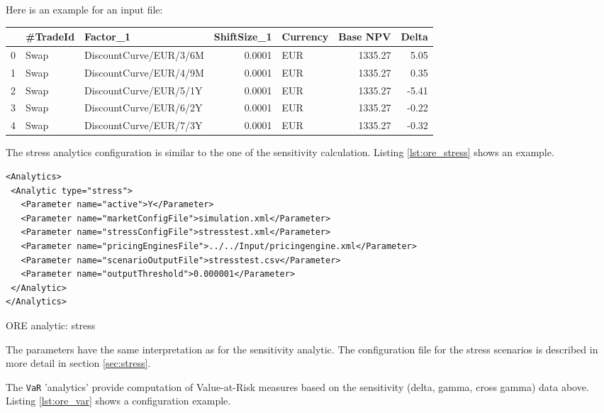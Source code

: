 \documentclass[12pt, a4paper]{article}
\begin{document}
Here is an example for an input file:

\begin{table}[hbt]
\scriptsize
\begin{center}
\begin{tabular}{lllrlrr}
\hline
{} & \#TradeId &                Factor\_1 &  ShiftSize\_1 & Currency &  Base NPV &  Delta \\
\hline
0 &     Swap &  DiscountCurve/EUR/3/6M &       0.0001 &      EUR &   1335.27 &   5.05 \\
1 &     Swap &  DiscountCurve/EUR/4/9M &       0.0001 &      EUR &   1335.27 &   0.35 \\
2 &     Swap &  DiscountCurve/EUR/5/1Y &       0.0001 &      EUR &   1335.27 &  -5.41 \\
3 &     Swap &  DiscountCurve/EUR/6/2Y &       0.0001 &      EUR &   1335.27 &  -0.22 \\
4 &     Swap &  DiscountCurve/EUR/7/3Y &       0.0001 &      EUR &   1335.27 &  -0.32 \\
\hline
\end{tabular}
\end{center}
\end{table}

The stress analytics configuration is similar to the one of the sensitivity calculation. Listing \ref{lst:ore_stress}
shows an example.

\begin{listing}[H]
\begin{verbatim}
<Analytics>
 <Analytic type="stress">
   <Parameter name="active">Y</Parameter>
   <Parameter name="marketConfigFile">simulation.xml</Parameter>
   <Parameter name="stressConfigFile">stresstest.xml</Parameter>
   <Parameter name="pricingEnginesFile">../../Input/pricingengine.xml</Parameter>
   <Parameter name="scenarioOutputFile">stresstest.csv</Parameter>
   <Parameter name="outputThreshold">0.000001</Parameter>
 </Analytic>
</Analytics>
\end{verbatim}
\caption{ORE analytic: stress}
\label{lst:ore_stress}
\end{listing}

The parameters have the same interpretation as for the sensitivity analytic. The configuration file for the stress
scenarios is described in more detail in section \ref{sec:stress}.

\medskip The {\tt VaR} 'analytics' provide computation of Value-at-Risk measures based on the sensitivity (delta, gamma, cross gamma) data above. Listing \ref{lst:ore_var} shows a configuration example.
\end{document}
